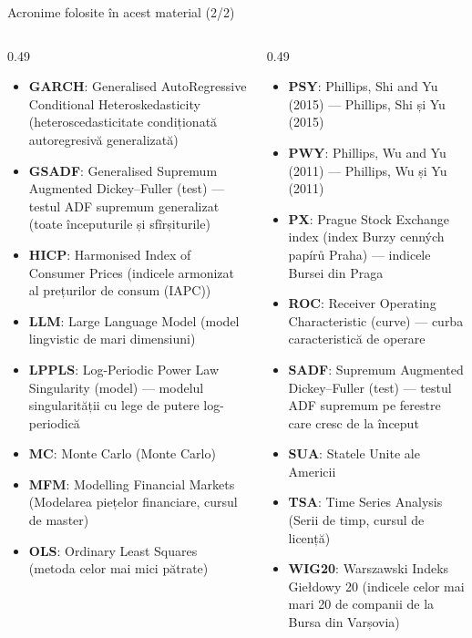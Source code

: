 \begin{frame}{Acronime folosite în acest material (2/2)}
\begin{columns}[T]
\begin{column}{0.49\textwidth}
\begin{itemize}\setlength{\itemsep}{0pt}
    \item \textbf{GARCH}: Generalised AutoRegressive Conditional Heteroskedasticity (heteroscedasticitate condiționată autoregresivă generalizată)
    \item \textbf{GSADF}: Generalised Supremum Augmented Dickey–Fuller (test) — testul ADF supremum generalizat (toate începuturile și sfîrșiturile)
    \item \textbf{HICP}: Harmonised Index of Consumer Prices (indicele armonizat al prețurilor de consum (IAPC))
    \item \textbf{LLM}: Large Language Model (model lingvistic de mari dimensiuni)
    \item \textbf{LPPLS}: Log-Periodic Power Law Singularity (model) — modelul singularității cu lege de putere log-periodică
    \item \textbf{MC}: Monte Carlo (Monte Carlo)
    \item \textbf{MFM}: Modelling Financial Markets (Modelarea piețelor financiare, cursul de master)
    \item \textbf{OLS}: Ordinary Least Squares (metoda celor mai mici pătrate)
\end{itemize}
\end{column}
\begin{column}{0.49\textwidth}
\begin{itemize}\setlength{\itemsep}{0pt}
    \item \textbf{PSY}: Phillips, Shi and Yu (2015) — Phillips, Shi și Yu (2015)
    \item \textbf{PWY}: Phillips, Wu and Yu (2011) — Phillips, Wu și Yu (2011)
    \item \textbf{PX}: Prague Stock Exchange index (index Burzy cenných papírů Praha) — indicele Bursei din Praga
    \item \textbf{ROC}: Receiver Operating Characteristic (curve) — curba caracteristică de operare
    \item \textbf{SADF}: Supremum Augmented Dickey–Fuller (test) — testul ADF supremum pe ferestre care cresc de la început
    \item \textbf{SUA}: Statele Unite ale Americii
    \item \textbf{TSA}: Time Series Analysis (Serii de timp, cursul de licență)
    \item \textbf{WIG20}: Warszawski Indeks Giełdowy 20 (indicele celor mai mari 20 de companii de la Bursa din Varșovia)
\end{itemize}
\end{column}
\end{columns}
\end{frame}

